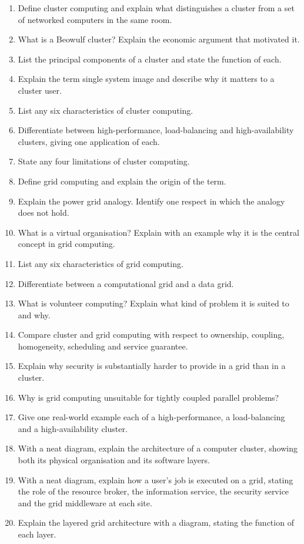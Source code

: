 \begin{enumerate}[label=\arabic*.]
  \item Define cluster computing and explain what distinguishes a cluster
        from a set of networked computers in the same room.
  \item What is a Beowulf cluster? Explain the economic argument that
        motivated it.
  \item List the principal components of a cluster and state the function of
        each.
  \item Explain the term single system image and describe why it matters to
        a cluster user.
  \item List any six characteristics of cluster computing.
  \item Differentiate between high-performance, load-balancing and
        high-availability clusters, giving one application of each.
  \item State any four limitations of cluster computing.
  \item Define grid computing and explain the origin of the term.
  \item Explain the power grid analogy. Identify one respect in which the
        analogy does not hold.
  \item What is a virtual organisation? Explain with an example why it is the
        central concept in grid computing.
  \item List any six characteristics of grid computing.
  \item Differentiate between a computational grid and a data grid.
  \item What is volunteer computing? Explain what kind of problem it is
        suited to and why.
  \item Compare cluster and grid computing with respect to ownership,
        coupling, homogeneity, scheduling and service guarantee.
  \item Explain why security is substantially harder to provide in a grid
        than in a cluster.
  \item Why is grid computing unsuitable for tightly coupled parallel
        problems?
  \item Give one real-world example each of a high-performance, a
        load-balancing and a high-availability cluster.
  \item With a neat diagram, explain the architecture of a computer cluster,
        showing both its physical organisation and its software layers.
  \item With a neat diagram, explain how a user's job is executed on a grid,
        stating the role of the resource broker, the information service, the
        security service and the grid middleware at each site.
  \item Explain the layered grid architecture with a diagram, stating the
        function of each layer.
\end{enumerate}

